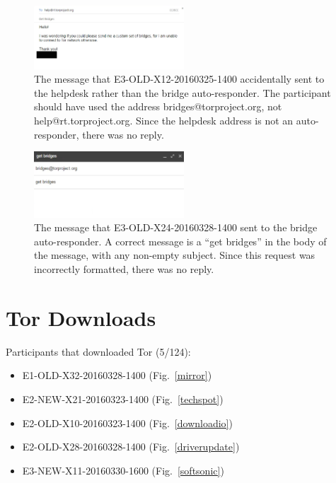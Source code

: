 \documentclass[USenglish,oneside,twocolumn]{article}
\begin{document}
\begin{figure}[h]
\includegraphics[width=0.5\textwidth]{../experiment/processing/failed-participants/20160328-133857-bridgeresponder-redacted.png}
\caption{The message that E3-OLD-X12-20160325-1400 accidentally sent to the helpdesk rather than the bridge auto-responder. The participant should have used the address bridges@torproject.org, not help@rt.torproject.org. Since the helpdesk address is not an auto-responder, there was no reply.}
\label{autoresponder2}
\end{figure} 

\begin{figure}[h]
\includegraphics[width=0.5\textwidth]{../experiment/processing/failed-participants/20160328-155924-bridgeresponder.png}
\caption{The message that E3-OLD-X24-20160328-1400 sent to the bridge auto-responder. A correct message is a ``get bridges'' in the body of the message, with any non-empty subject. Since this request was incorrectly formatted, there was no reply.}
\label{autoresponder3}
\end{figure} 

\section{Tor Downloads}
\label{tor-downloads}

Participants that downloaded Tor (5/124): 
\begin{itemize}
\item E1-OLD-X32-20160328-1400 (Fig.~\ref{mirror})
\item E2-NEW-X21-20160323-1400 (Fig.~\ref{techspot})
\item E2-OLD-X10-20160323-1400 (Fig.~\ref{downloadio})
\item E2-OLD-X28-20160328-1400 (Fig.~\ref{driverupdate})
\item E3-NEW-X11-20160330-1600 (Fig.~\ref{softsonic})
\end{itemize} 
\end{document}
